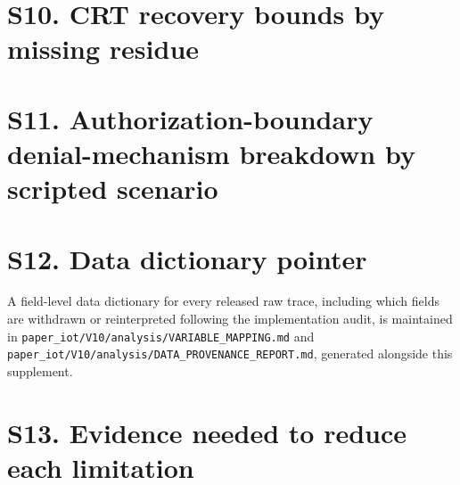 \documentclass[11pt]{article}
\begin{document}
\section*{S10. CRT recovery bounds by missing residue}



\section*{S11. Authorization-boundary denial-mechanism breakdown by scripted scenario}

\begingroup
\small
\resizebox{\linewidth}{!}{%
%
}
\endgroup

\section*{S12. Data dictionary pointer}

A field-level data dictionary for every released raw trace, including which fields are withdrawn or reinterpreted following the implementation audit, is maintained in \texttt{paper\_iot/V10/analysis/VARIABLE\_MAPPING.md} and \texttt{paper\_iot/V10/analysis/DATA\_PROVENANCE\_REPORT.md}, generated alongside this supplement.

\section*{S13. Evidence needed to reduce each limitation}
\end{document}
